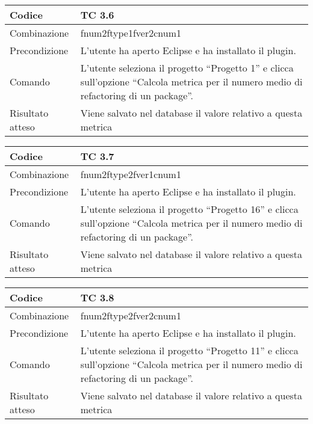 \begin{table}[ht]
\begin{tabular}{|p{3cm}|p{9cm}|}
\hline
\cellcolor{lightgray}Codice				& TC 3.6								\\
\hline
\cellcolor{lightgray}Combinazione		& fnum2ftype1fver2cnum1									\\
\hline
\cellcolor{lightgray}Precondizione		& L'utente ha aperto Eclipse e ha installato il plugin.				\\
\hline
\cellcolor{lightgray}Comando			& L'utente seleziona il progetto ``Progetto 1''  e clicca sull'opzione ``Calcola metrica per il numero medio di refactoring di un package''.	\\
\hline
\cellcolor{lightgray}Risultato atteso	& Viene salvato nel database il valore relativo a questa metrica	\\
\hline
\end{tabular}
\end{table}

\begin{table}[ht]
\begin{tabular}{|p{3cm}|p{9cm}|}
\hline
\cellcolor{lightgray}Codice				& TC 3.7								\\
\hline
\cellcolor{lightgray}Combinazione		& fnum2ftype2fver1cnum1								\\
\hline
\cellcolor{lightgray}Precondizione		& L'utente ha aperto Eclipse e ha installato il plugin.									\\
\hline
\cellcolor{lightgray}Comando			& L'utente seleziona il progetto ``Progetto 16''  e clicca sull'opzione ``Calcola metrica per il numero medio di refactoring di un package''.	\\
\hline
\cellcolor{lightgray}Risultato atteso	& Viene salvato nel database il valore relativo a questa metrica	\\
\hline
\end{tabular}
\end{table}

\begin{table}[ht]
\begin{tabular}{|p{3cm}|p{9cm}|}
\hline
\cellcolor{lightgray}Codice				& TC 3.8								\\
\hline
\cellcolor{lightgray}Combinazione		& fnum2ftype2fver2cnum1 									\\
\hline
\cellcolor{lightgray}Precondizione		& L'utente ha aperto Eclipse e ha installato il plugin.				\\
\hline
\cellcolor{lightgray}Comando			& L'utente seleziona il progetto ``Progetto 11''  e clicca sull'opzione ``Calcola metrica per il numero medio di refactoring di un package''.	\\
\hline
\cellcolor{lightgray}Risultato atteso	& Viene salvato nel database il valore relativo a questa metrica	\\
\hline
\end{tabular}
\end{table}

